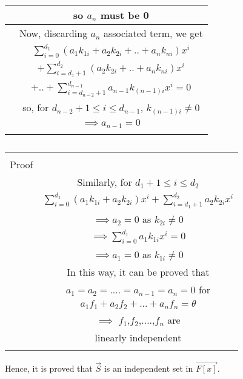 \begin{table}[ht!]
\begin{center}
\begin{tabular}{|c|c|}
& so $a_n$ must be 0\\
\hline
& Now, discarding $a_n$ associated term, we get\\
& $\sum_{i=0}^{d_1}(a_1k_{1i}+a_2k_{2i}+..+a_nk_{ni})x^i$\\
& $+\sum_{i=d_1+1}^{d_2}(a_2k_{2i}+..+a_nk_{ni})x^i$\\
& $+..+\sum_{i=d_{n-2}+1}^{d_{n-1}}a_{n-1}k_{(n-1)i}x^i =0$\\
& so, for $d_{n-2}+1\leq i \leq d_{n-1}$, $k_{(n-1)i}\neq 0$\\
& $\implies a_{n-1}=0$ \\
& \\
\hline
\end{tabular}
\end{center}
\caption{}
\label{eq:solutions/4/1/6/table1}
%
\end{table}

\begin{table}[ht!]
\begin{center}
\begin{tabular}{|c|c|}
\hline
& \\
Proof & \\
& Similarly, for $d_1+1 \leq i \leq d_2$\\
& $\sum_{i=0}^{d_1}(a_1k_{1i}+a_2k_{2i})x^i + \sum_{i=d_1+1}^{d_2}a_2k_{2i}x^i$\\
& $\implies a_2=0$ as $k_{2i} \neq 0$\\
& $\implies \sum_{i=0}^{d_1}a_1k_{1i}x^i=0$\\
& $\implies a_1=0$ as $k_{1i} \neq 0$\\
\hline
& In this way, it can be proved that\\
& $a_1=a_2=....=a_{n-1}=a_n=0$ for\\
& $a_1f_1+a_2f_2+...+a_nf_n=\theta$\\
& $\implies$ $f_1$,$f_2$,....,$f_n$ are\\
& linearly independent\\
& \\
\hline
\end{tabular}
\end{center}
\caption{}
\label{eq:solutions/4/1/6/table2}
%
\end{table}


Hence, it is proved that $\vec{S}$ is an independent set in $\vec{F[x]}$.
